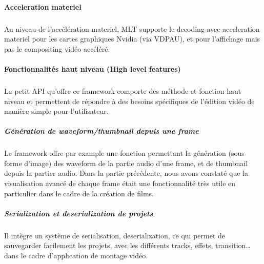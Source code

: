 \paragraph{Acceleration materiel}

\subparagraph{}

Au niveau de l'accélération materiel, MLT supporte le decoding
avec acceleration materiel pour les cartes graphiques Nvidia
 (via VDPAU), et pour l'affichage
mais pas le compositing vidéo accéléré.


\paragraph{Fonctionnalités haut niveau (High level features)}

\subparagraph{}

La petit API qu'offre ce framework comporte des méthode et fonction
haut niveau et permettent de répondre à des besoins spécifiques de
l'édition vidéo de manière simple pour l'utilisateur.

\subparagraph{Génération de waveform/thumbnail depuis une frame}

\subparagraph{}

Le framework offre par example une fonction permettant la génération
(sous forme d'image) des waveform de la partie audio d'une frame, et de
thumbnail depuis la partier audio.  Dans la partie précédente, nous
avons constaté que la visualisation avancé de chaque frame était une
fonctionnalité très utile en particulier dans le cadre de la création
de films.

\subparagraph{Serialization et deserialization de projets}

\subparagraph{}

Il intègre un système de serialisation, deserialization, ce qui permet
de sauvegarder facilement les projets, avec les différents tracks,
effets, transition\ldots dans le cadre d'application de montage vidéo.

